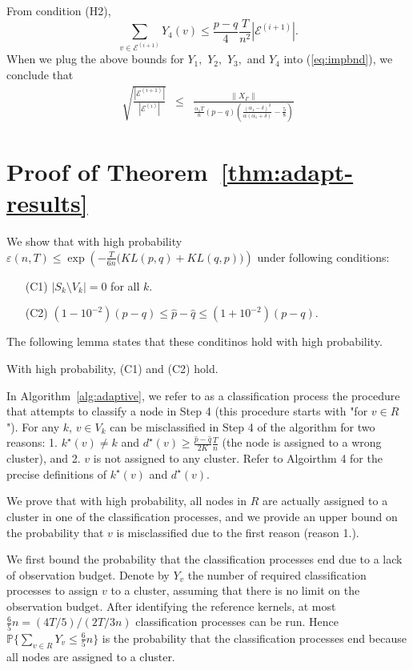 From condition (H2),
$$\sum_{v\in  \mathcal{E}^{(i+1)}} Y_4(v) \le
\frac{p-q}{4}\frac{T}{n^2}  |  \mathcal{E}^{(i+1)} |.$$
When we plug the above bounds for $Y_1 ,$ $Y_2 ,$ $Y_3 ,$ and $Y_4$ into
(\ref{eq:impbnd}), we conclude that 
\begin{eqnarray*}
\sqrt{\frac{ | \mathcal{E}^{(i+1)} |}{| \mathcal{E}^{(i)}|}}
& \le & \frac{\|X_{\Gamma} \|}{ \frac{\alpha_1 T}{n}(p-q)\left(\frac{(\alpha_1 - \delta)^2}{\alpha(\alpha_1 + \delta)} - \frac{5}{8}  \right) } 
\end{eqnarray*}



\section{Proof of Theorem~\ref{thm:adapt-results}}

We show that with high probability $\varepsilon (n,T) \le \exp\left(-\frac{T}{6n} \big( KL(p,q)
  + KL(q , p) \big) \right)$ under following conditions:
\begin{itemize}
\item[(C1)] $|S_k \setminus V_k| = 0$ for all $k.$
\item[(C2)] $(1-10^{-2}) (p-q) \le \hat{p} - \hat{q} \le (1+10^{-2})(p-q).$
\end{itemize}
The following lemma states that these conditinos hold with high probability.
\begin{lemma}
With high probability, (C1) and (C2) hold.\label{lem:condonadap}
\end{lemma}

In Algorithm~\ref{alg:adaptive}, we refer to as a classification process the procedure that attempts to classify a node in Step 4 (this procedure starts with "for $v\in R$"). For any $k$, $v \in V_k$ can be misclassified in Step 4 of the algorithm for two reasons: 1. $k^{\star}(v) \neq k$ and
$d^{\star}(v) \ge \frac{\hat{p}-\hat{q}}{2K}\frac{T}{n}$ (the node is assigned to a wrong cluster), and 2. $v$ is not assigned to any cluster. Refer to Algoirthm 4 for the precise definitions of $k^\star(v)$ and $d^\star(v)$.

We prove that with high probability, all nodes in $R$ are actually assigned to a cluster in one of the classification processes, and we provide an upper bound on the probability that $v$ is misclassified due to the first reason (reason 1.).

We first bound the probability that the classification processes end due to a lack of observation budget. Denote by $Y_v$ the number of required classification processes to assign $v$ to a cluster, assuming that there is no limit on the observation budget. After identifying the reference
kernels, at most $\frac{6}{5} n = (4T/5)/(2T/3n)$ classification processes can be run. Hence $\mathbb{P}\{ \sum_{v\in R} Y_v \le \frac{6}{5}n \}$ is the probability
that the classification processes end because all nodes are assigned to a cluster.

